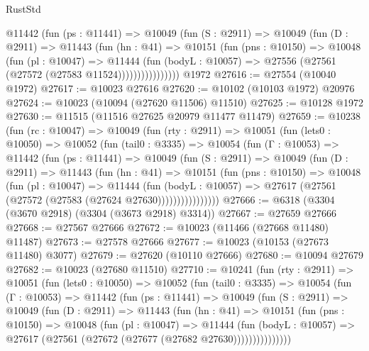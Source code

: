 \begin{lexlean}{RustStd}
\begin{coremodule}
              @11442
                (fun (ps : @11441) =>
                @10049
                  (fun (S : @2911) =>
                  @10049
                    (fun (D : @2911) =>
                    @11443
                      (fun (hn : @41) =>
                      @10151
                        (fun (pns : @10150) =>
                        @10048
                          (fun (pl : @10047) =>
                          @11444
                            (fun (bodyL : @10057) =>
                            @27556 (@27561 (@27572 (@27583 @11524))))))))))))))))
    @1972
@27616 := @27554 (@10040 @1972)
@27617 := @10023 @27616
@27620 := @10102 (@10103 @1972) @20976
@27624 := @10023 (@10094 (@27620 @11506) @11510)
@27625 := @10128 @1972
@27630 := @11515 (@11516 @27625 @20979 @11477 @11479)
@27659 := @10238
    (fun (rc : @10047) =>
    @10049
      (fun (rty : @2911) =>
      @10051
        (fun (lets0 : @10050) =>
        @10052
          (fun (tail0 : @3335) =>
          @10054
            (fun (Γ : @10053) =>
            @11442
              (fun (ps : @11441) =>
              @10049
                (fun (S : @2911) =>
                @10049
                  (fun (D : @2911) =>
                  @11443
                    (fun (hn : @41) =>
                    @10151
                      (fun (pns : @10150) =>
                      @10048
                        (fun (pl : @10047) =>
                        @11444
                          (fun (bodyL : @10057) =>
                          @27617 (@27561 (@27572 (@27583 (@27624 @27630))))))))))))))))
@27666 := @6318 (@3304 (@3670 @2918) (@3304 (@3673 @2918) @3314))
@27667 := @27659 @27666
@27668 := @27567 @27666
@27672 := @10023 (@11466 (@27668 @11480) @11487)
@27673 := @27578 @27666
@27677 := @10023 (@10153 (@27673 @11480) @3077)
@27679 := @27620 (@10110 @27666)
@27680 := @10094 @27679
@27682 := @10023 (@27680 @11510)
@27710 := @10241
    (fun (rty : @2911) =>
    @10051
      (fun (lets0 : @10050) =>
      @10052
        (fun (tail0 : @3335) =>
        @10054
          (fun (Γ : @10053) =>
          @11442
            (fun (ps : @11441) =>
            @10049
              (fun (S : @2911) =>
              @10049
                (fun (D : @2911) =>
                @11443
                  (fun (hn : @41) =>
                  @10151
                    (fun (pns : @10150) =>
                    @10048
                      (fun (pl : @10047) =>
                      @11444
                        (fun (bodyL : @10057) =>
                        @27617 (@27561 (@27672 (@27677 (@27682 @27630)))))))))))))))

\end{coremodule}
\end{lexlean}
